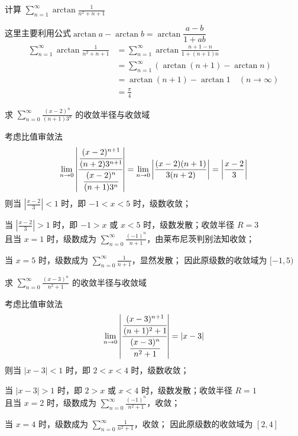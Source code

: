 \documentclass[color=green,titlestyle=hang]{elegantbook}%
\begin{document}
\begin{example}
计算 $\displaystyle \sum_{n=1}^\infty \arctan\frac{1}{n^2+n+1}$	
\end{example}\begin{solution}
这里主要利用公式$\arctan a-\arctan b=\arctan\dfrac{a-b}{1+ab}$
\begin{align*}
\sum_{n=1}^\infty \arctan\frac{1}{n^2+n+1}&=\sum_{n=1}^\infty \arctan\frac{n+1-n}{1+(n+1)n}\\
&=\sum_{n=1}^\infty (\arctan(n+1)-\arctan n)\\
&=\arctan(n+1)-\arctan 1\quad(n\to \infty)\\
&=\frac{\pi}{4}
\end{align*}	
\end{solution}

\begin{example}
求 $\sum_{n=0}^{\infty}\frac{(x-2)^n}{(n+1)3^n}$ 的收敛半径与收敛域	
\end{example}\begin{Solution}考虑比值审敛法
\[\lim_{n\to0}\left|\cfrac{\cfrac{(x-2)^{n+1}}{(n+2)3^{n+1}}}{\cfrac{(x-2)^n}{(n+1)3^n}}\right|=\lim_{n\to0}\left|\frac{(x-2)(n+1)}{3(n+2)}\right|=\left|\frac{x-2}{3}\right|\]
则当 $\left|\frac{x-2}{3}\right|<1$ 时，即 $-1<x<5$ 时，级数收敛；\\
\par\setlength{\parindent}{1em}当 $\left|\frac{x-2}{3}\right|>1$ 时，即 $-1>x$ 或 $x<5$ 时，级数发散；{\color{red}收敛半径 $R=3$}\\
且当  $x=1$ 时，级数成为 $\sum_{n=0}^{\infty}\frac{(-1)^n}{n+1}$，由莱布尼茨判别法知收敛；\\
\par 当  $x=5$ 时，级数成为 $\sum_{n=0}^{\infty}\frac{1}{n+1}$，显然发散；
因此原级数的{\color{red}收敛域为 $[-1,5)$}	
\end{Solution}

\begin{example}
求 $\sum_{n=0}^{\infty}\frac{(x-3)^n}{n^2+1}$ 的收敛半径与收敛域	
\end{example}\begin{Solution}考虑比值审敛法
\[\lim_{n\to0}\left|\cfrac{\cfrac{(x-3)^{n+1}}{(n+1)^2+1}}{\cfrac{(x-3)^n}{n^2+1}}\right|=|x-3|\]
则当 $|x-3|<1$ 时，即 $2<x<4$ 时，级数收敛；
\par\setlength{\parindent}{1em}当 $\left|x-3\right|>1$ 时，即 $2>x$ 或 $x<4$ 时，级数发散；{\color{red}收敛半径 $R=1$}\\
且当  $x=2$ 时，级数成为 $\sum_{n=0}^{\infty}\frac{(-1)^n}{n^2+1}$，收敛；\\
\par 当  $x=4$ 时，级数成为 $\sum_{n=0}^{\infty}\frac{1}{n^2+1}$，收敛；
因此原级数的{\color{red}收敛域为 $[2,4]$}	
\end{Solution}
\end{document}
